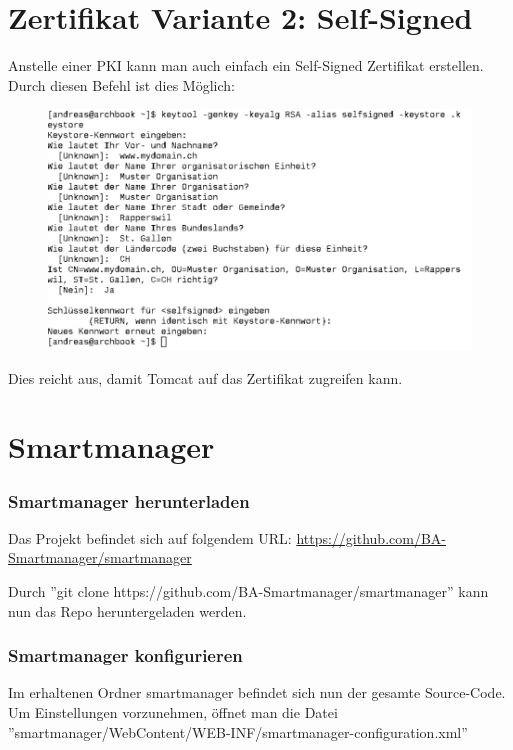 \section{Zertifikat Variante 2: Self-Signed}
Anstelle einer PKI kann man auch einfach ein Self-Signed Zertifikat erstellen. Durch diesen Befehl ist dies Möglich:
\begin{figure}[H]
\centering
\includegraphics[scale=0.65]{../05_Schlussbericht/images/keystore6.png}
\end{figure}

Dies reicht aus, damit Tomcat auf das Zertifikat zugreifen kann.

\newpage


\section{Smartmanager}
\subsubsection{Smartmanager herunterladen}
Das Projekt befindet sich auf folgendem URL: \href{https://github.com/BA-Smartmanager/smartmanager}{https://github.com/BA-Smartmanager/smartmanager}

Durch ''git clone https://github.com/BA-Smartmanager/smartmanager'' kann nun das Repo heruntergeladen werden.

\subsubsection{Smartmanager konfigurieren}
Im erhaltenen Ordner smartmanager befindet sich nun der gesamte Source-Code. Um Einstellungen vorzunehmen, öffnet man die Datei ''smartmanager/WebContent/WEB-INF/smartmanager-configuration.xml''

